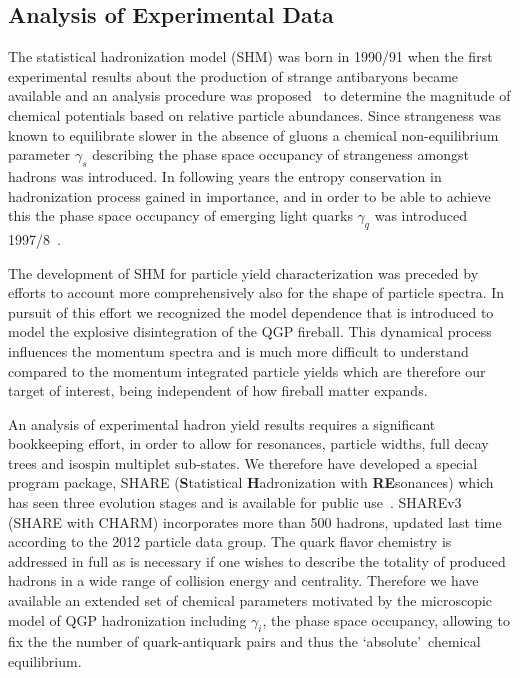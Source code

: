\documentclass{appolb}
\begin{document}
\subsection{Analysis of Experimental Data}\label{ssec:analysis}
The statistical hadronization model (SHM)  was born in 1990/91 when the first experimental results about the production of strange antibaryons became available and an analysis procedure was proposed~\cite{Rafelski:1991rh} to determine the magnitude of chemical potentials based on relative particle abundances. Since strangeness was known to equilibrate slower in the absence of gluons a chemical non-equilibrium parameter $\gamma_s$ describing the phase space occupancy of strangeness amongst hadrons was introduced. In following years the entropy conservation in hadronization process gained in importance, and in order to be able to achieve this the phase space occupancy of emerging light quarks $\gamma_q$ was introduced 1997/8~\cite{Letessier:1998sz}. 

The development of SHM for particle yield characterization was preceded by efforts to account more comprehensively also for the shape of particle spectra. In pursuit of this effort we recognized the model dependence that is introduced to model the explosive disintegration of the QGP fireball. This dynamical process influences the momentum spectra and is much more difficult to understand compared to the momentum integrated particle yields which are therefore our target of interest, being independent of how fireball matter expands. 

An analysis of experimental hadron yield results requires a significant bookkeeping effort, in order to allow for resonances, particle widths, full decay trees and isospin multiplet sub-states. We therefore have developed a special program package, SHARE ({\bf S}tatistical {\bf H}adronization with {\bf RE}sonances) which has seen three evolution stages and is available for public use~\cite{Torrieri:2004zz,Torrieri:2006xi,Petran:2013dva}. SHAREv3 (SHARE with CHARM) incorporates  more than 500 hadrons, updated last time according to the 2012 particle data group. The quark flavor chemistry is addressed in full as is necessary if one wishes to describe the totality of produced hadrons in a wide range of collision energy and centrality. Therefore we have available an extended set of chemical parameters motivated by the microscopic model of QGP hadronization including  $\gamma_i$, the phase space occupancy, allowing to fix the  the number of quark-antiquark pairs and thus the \lq absolute\rq\ chemical equilibrium.
\end{document}
